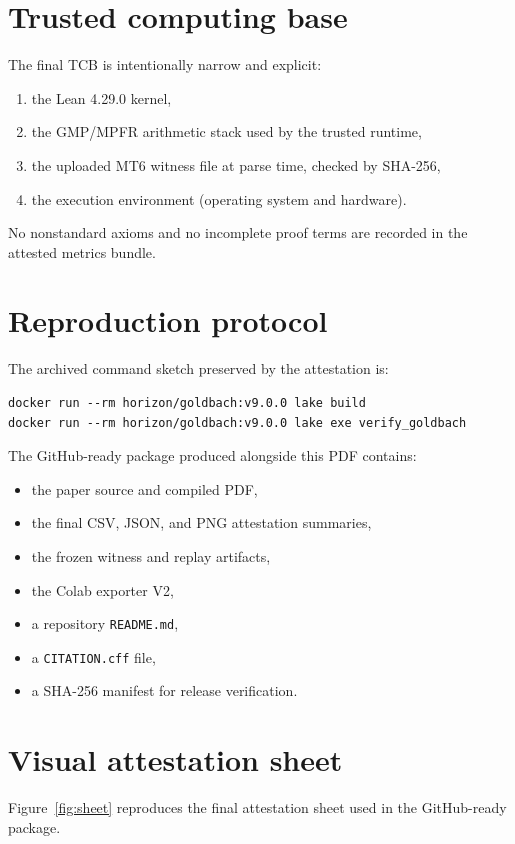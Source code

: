 \documentclass[11pt]{article}
\begin{document}
\section{Trusted computing base}
The final TCB is intentionally narrow and explicit:
\begin{enumerate}[label=\arabic*.]
    \item the Lean 4.29.0 kernel,
    \item the GMP/MPFR arithmetic stack used by the trusted runtime,
    \item the uploaded MT6 witness file at parse time, checked by SHA-256,
    \item the execution environment (operating system and hardware).
\end{enumerate}
No nonstandard axioms and no incomplete proof terms are recorded in the attested metrics bundle.

\section{Reproduction protocol}
The archived command sketch preserved by the attestation is:
\begin{lstlisting}[basicstyle=\ttfamily\small]
docker run --rm horizon/goldbach:v9.0.0 lake build
docker run --rm horizon/goldbach:v9.0.0 lake exe verify_goldbach
\end{lstlisting}

The GitHub-ready package produced alongside this PDF contains:
\begin{itemize}
    \item the paper source and compiled PDF,
    \item the final CSV, JSON, and PNG attestation summaries,
    \item the frozen witness and replay artifacts,
    \item the Colab exporter V2,
    \item a repository \texttt{README.md},
    \item a \texttt{CITATION.cff} file,
    \item a SHA-256 manifest for release verification.
\end{itemize}

\section{Visual attestation sheet}
Figure~\ref{fig:sheet} reproduces the final attestation sheet used in the GitHub-ready package.
\end{document}
